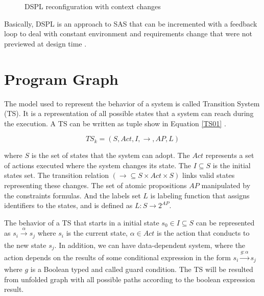 \begin{figure}[h]
\centering
\label{dspl01}
\scalebox{.5}{}
\caption{DSPL reconfiguration with context changes}
\end{figure}

Basically, DSPL is an approach to SAS that can be incremented with a feedback loop to deal with constant environment and requirements change that were not previewed at design time \cite{SAS100-04}.


\section {Program Graph}

The model used to represent the behavior of a system is called Transition System (TS). It is a representation of all possible states that a system can reach during the execution. A TS can be written as tuple show in Equation \ref{TS01} .

\begin{center}
\begin{equation}
        TS_{k} = (S, Act, I, \longrightarrow, AP ,L)
        \label{TS01}
    \end{equation}
\end{center}

where $S$ is the set of states that the system can adopt. The $Act$ represents a set of actions executed where the system changes its state. The $I \subseteq S$ is the initial states set. The transition relation $(\longrightarrow \subseteq S \times Act \times S)$ links valid states representing these changes. The set of atomic propositions $AP$ manipulated by the constraints formulas. And the labels set $L$ is labeling function that assigns identifiers to the states, and is defined as $L:S \longrightarrow 2^{AP}$.

The behavior of a TS that starts in a initial state $s_0 \in I \subseteq S$ can be represented as $s_i \xrightarrow[]{\alpha} s_j$ where $s_i$ is the current state, $\alpha \in Act$ is the action that conducts to the new state $s_j$. In addition, we can have data-dependent system, where the action depends on the results of some conditional expression in the form $s_i \xrightarrow[]{g:\alpha} s_j$ where $g$ is a Boolean typed and called guard condition. The TS will be resulted from unfolded graph with all possible paths according to the boolean expression result\cite{baier}.

